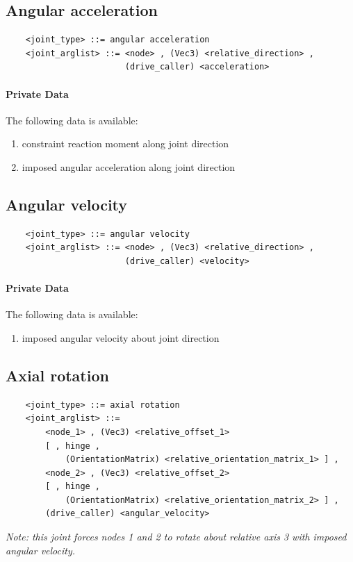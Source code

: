 \subsection{Angular acceleration}
\begin{verbatim}
    <joint_type> ::= angular acceleration
    <joint_arglist> ::= <node> , (Vec3) <relative_direction> , 
                        (drive_caller) <acceleration>
\end{verbatim}

\paragraph{Private Data}
The following data is available:
\begin{enumerate}
\item {} constraint reaction moment along joint direction
\item {} imposed angular acceleration along joint direction
\end{enumerate}




\subsection{Angular velocity}
\begin{verbatim}
    <joint_type> ::= angular velocity
    <joint_arglist> ::= <node> , (Vec3) <relative_direction> , 
                        (drive_caller) <velocity>
\end{verbatim}

\paragraph{Private Data}
The following data is available:
\begin{enumerate}
\item {} imposed angular velocity about joint direction
\end{enumerate}

\subsection{Axial rotation}
\begin{verbatim}
    <joint_type> ::= axial rotation
    <joint_arglist> ::= 
        <node_1> , (Vec3) <relative_offset_1> 
        [ , hinge , 
            (OrientationMatrix) <relative_orientation_matrix_1> ] ,
        <node_2> , (Vec3) <relative_offset_2>
        [ , hinge , 
            (OrientationMatrix) <relative_orientation_matrix_2> ] ,
        (drive_caller) <angular_velocity>
\end{verbatim}
{\em
    Note: this joint forces nodes 1 and 2 to rotate about relative 
    axis 3 with imposed angular velocity.
}

